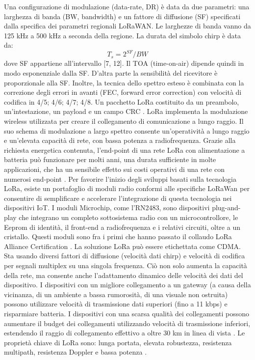 \documentclass[a4paper]{report} %
\begin{document}
Una configurazione di modulazione (data-rate, DR) è data da due parametri: una larghezza di banda (BW, bandwidth) e un fattore di diffusione (SF) specificati dalla specifica dei parametri regionali LoRaWAN. Le larghezze di banda vanno da 125 kHz a 500 kHz a seconda della regione. La durata del simbolo chirp è data da:
\begin{equation}
 T_s = 2^{SF} / BW
\end{equation}
dove SF appartiene all'intervallo [7, 12]. Il TOA (time-on-air) dipende quindi in modo esponenziale dalla SF. D'altra parte la sensibilità del ricevitore è proporzionale alla SF. Inoltre, la tecnica dello spettro esteso è combinata con la correzione degli errori in avanti (FEC, forward error correction) con velocità di codifica in {4/5; 4/6; 4/7; 4/8}. Un pacchetto LoRa costituito da un preambolo, un'intestazione, un payload e un campo CRC \cite{art:rif.48}. 
LoRa implementa la modulazione wireless utilizzata per creare il collegamento di comunicazione a lungo raggio. 
Il suo schema di modulazione a largo spettro consente un'operatività a lungo raggio e un'elevata capacità di rete, con bassa potenza a radiofrequenza. Grazie alla richiesta energetica contenuta, l'end-point di una rete LoRa con alimentazione a batteria può funzionare per molti anni, una durata sufficiente in molte applicazioni, che ha un sensibile effetto sui costi operativi di una rete con numerosi end-point \cite{art:rif.23}. 
Per favorire l'inizio degli sviluppi basati sulla tecnologia LoRa, esiste un portafoglio di moduli radio conformi alle specifiche LoRaWan per consentire di semplificare e accelerare l'integrazione di questa tecnologia nei dispositivi IoT. I moduli Microchip, come l'RN2483, sono dispositivi plug-and-play che integrano un completo sottosistema radio con un microcontrollore, le Eeprom di identità, il front-end a radiofrequenza e i relativi circuiti, oltre a un cristallo. Questi moduli sono fra i primi che hanno passato il collaudo LoRa Alliance Certification \cite{art:rif.20}. 
La soluzione LoRa può essere etichettata come CDMA. Sta usando diversi fattori di diffusione (velocità dati chirp) e velocità di codifica per segnali multiplex su una singola frequenza. Ciò non solo aumenta la capacità della rete, ma consente anche l'adattamento dinamico delle velocità dei dati del dispositivo. I dispositivi con un migliore collegamento a un gateway (a causa della vicinanza, di un ambiente a bassa rumorosità, di una visuale non ostruita) possono utilizzare velocità di trasmissione dati superiori (fino a 11 kbps) e risparmiare batteria. I dispositivi con una scarsa qualità dei collegamenti possono aumentare il budget dei collegamenti utilizzando velocità di trasmissione inferiori, estendendo il raggio di collegamento effettivo a oltre 30 km in linea di vista \cite{art:rif.30}. 
Le proprietà chiave di LoRa sono: lunga portata, elevata robustezza, resistenza multipath, resistenza Doppler e bassa potenza \cite{art:rif.43}.
\end{document}
